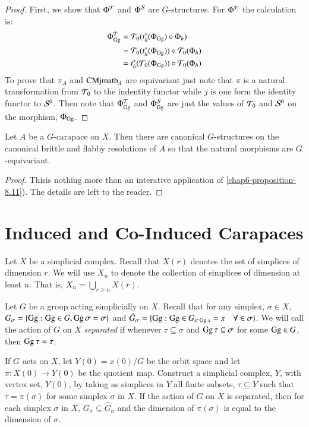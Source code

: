 \begin{proof}
First, we show that $\Phi^{\mathcal{T}}$ and $\Phi^{\mathcal{S}}$ are $G$-structures. For $\Phi^{\mathcal{T}}$ the calculation is:
\begin{align*}
\Phi_{\operatorname{Gg}}^{\mathcal{T}} &= \mathcal{T}_{0}(t_{h}^{*}(\Phi_{\operatorname{Gg}}) \circ \Phi_{h})\\
&= \mathcal{T}_{0}(t_{h}^{*}(\Phi_{\operatorname{Gg}})) \circ \mathcal{T}_{0}(\Phi_{h})\\
& = t_{h}^{*}(\mathcal{T}_{0}(\Phi_{\operatorname{Gg}})) \circ \mathcal{T}_{0}(\Phi_{h})
\end{align*}
To prove that $\pi_{A}$ and $\operatorname{CMjmath}_{A}$ are equivariant just note that $\pi$ is a natural transformation from $\mathcal{T}_{0}$ to the indentity functor while $j$ is one form the identity functor to $\mathcal{S}^{0}$. Then note that $\Phi_{\operatorname{Gg}}^{\mathcal{T}}$ and $\Phi_{\operatorname{Gg}}^{\mathcal{S}}$ are just the values of $\mathcal{T}_{0}$ and $\mathcal{S}^{0}$ on the morphism, $\Phi_{\operatorname{Gg}}$.
\end{proof}

\begin{seccoro}\label{chap6-corollary-8.12}
Let $A$ be a $G$-carapace on $X$. Then there are canonical $G$-structures on the canonical brittle and flabby resolutions of $A$ so that the natural morphisms are $G$-equivariant.
\end{seccoro}

\begin{proof}
This\pageoriginale is nothing more than an interative application of \ref{chap6-proposition-8.11}). The details are left to the reader.
\end{proof}

\section{Induced and Co-Induced Carapaces}\label{chap6-sec-9}
Let $X$ be a simplicial complex. Recall that $X(r)$ denotes the set of simplices of dimension $r$. We will use $X_{n}$ to denote the collection of simplices of dimension at least $n$. That is, $X_{n} = \bigcup_{r \geq n}X(r)$.

Let $G$ be a group acting simplicially on $X$. Recall that for any simplex, $\sigma \in X$, $G_{\sigma} = \{\operatorname{Gg} : \operatorname{Gg} \in G, \operatorname{Gg} \sigma = \sigma\}$ and $\hat{G}_{\sigma}= \{ \operatorname{Gg} : \operatorname{Gg} \in G_{\sigma \operatorname{Gg} x} = x \quad \forall \in \sigma \}$. We will call the action of $G$ on $X$ \textit{separated} if whenever $\tau \subseteq \sigma$ and $\operatorname{Gg}\tau \subseteq \sigma$ for some $\operatorname{Gg} \in G$, then $\operatorname{Gg}\tau = \tau$.

If $G$ acts on $X$, let $Y(0)= x(0)/G$ be the orbit space and let $\pi : X(0)\rightarrow Y(0)$ be the quotient map. Construct a simplicial complex, $Y$, with vertex set, $Y(0)$, by taking as simplices in $Y$ all finite subsets, $\tau \subseteq Y$ such that $\tau = \pi(\sigma)$ for some simplex $\sigma$ in $X$. If the action of $G$ on $X$ is separated, then for each simplex $\sigma$ in $X$, $G_{\sigma} \subseteq \hat{G}_{\sigma}$ and the dimension of $\pi(\sigma)$ is equal to the dimension of $\sigma$.

